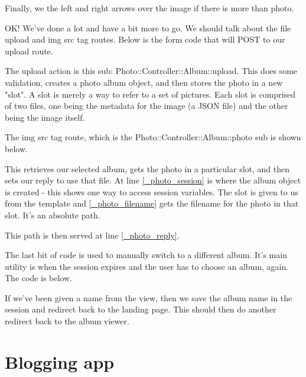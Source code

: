 \documentclass[14pt]{extreport}
\newcommand\Small{\fontsize{12}{13.0}\fontencoding{T1}\selectfont}
\newcommand*\LSTfont{\Small\ttfamily\SetTracking{encoding=*}{-60}\lsstyle}
\begin{document}


Finally, we the left and right arrows over the image if there is more than photo.

OK!  We've done a lot and have a bit more to go.  We should talk about the file upload
and img src tag routes.  Below is the form code that will POST to our upload route.



The upload action is this sub: Photo::Controller::Album::upload.  This does
some validation, creates a photo album object, and then stores the photo in a
new "slot".  A slot is merely a way to refer to a set of pictures.  Each slot
is comprised of two files, one being the metadata for the image (a JSON file)
and the other being the image itself.

The img src tag route, which is the Photo::Controller::Album::photo sub is shown below.



This retrieves our selected album, gets the photo in a particular slot, and
then sets our reply to use that file. At line \ref{_photo_session} is where the
album object is created - this shows one way to access session variables. The slot
is given to us from the template and \ref{_photo_filename} gets the filename
for the photo in that slot.  It's an absolute path.

This path is then served at line \ref{_photo_reply}.

The last bit of code is used to manually switch to a different album. It's main utility
is when the session expires and the user has to choose an album, again.  The code is
below.



If we've been given a name from the view, then we save the album name in the session and
redirect back to the landing page.  This should then do another redirect back to the
album viewer.

\section{Blogging app}
\end{document}
